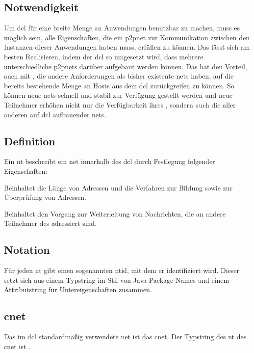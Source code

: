 
\subsection{Notwendigkeit}
Um \gls{dcl} für eine breite Menge an Anwendungen benutzbar zu machen, muss es möglich sein, alle
Eigenschaften, die ein \gls{p2pnet} zur Kommunikation zwischen den Instanzen dieser Anwendungen
haben muss, erfüllen zu können. Das lässt sich am besten Realisieren, indem der \gls{dcl} so umgesetzt
wird, dass mehrere unterschiedliche \glspl{p2pnet} darüber aufgebaut werden können.
Das hat den Vorteil, auch mit , die andere Anforderungen
als bisher existente \glspl{net} haben, auf die bereits bestehende Menge an Hosts aus dem \gls{dcl}
zurückgreifen zu können. So können neue \glspl{net} schnell und stabil zur Verfügung gestellt werden
und neue Teilnehmer erhöhen nicht nur die Verfügbarkeit ihres , sondern auch
die aller anderen auf \gls{dcl} aufbauender \glspl{net}.

\subsection{Definition}
Ein \gls{nt} beschreibt ein \gls{net} innerhalb des \gls{dcl} durch Festlegung folgender Eigenschaften:

\begin{description}
	
		Beinhaltet die Länge von Adressen und die Verfahren zur Bildung sowie zur Überprüfung
		von Adressen.
	
		Beinhaltet den Vorgang zur Weiterleitung von Nachrichten, die an andere Teilnehmer des
		 adressiert sind.
	
\end{description}

\subsection{Notation}
Für jeden \gls{nt} gibt einen sogenannten \gls{ntid}, mit dem er identifiziert wird. Dieser setzt sich aus
einem Typstring im Stil von Java Package Names und einem Attributstring für Untereigenschaften zusammen.

\subsection{\gls*{cnet}}
Das im \gls{dcl} standardmäßig verwendete \gls{net} ist das \gls{cnet}. Der Typstring des \gls{nt} des
\gls{cnet} ist \code{\cnettype}.

